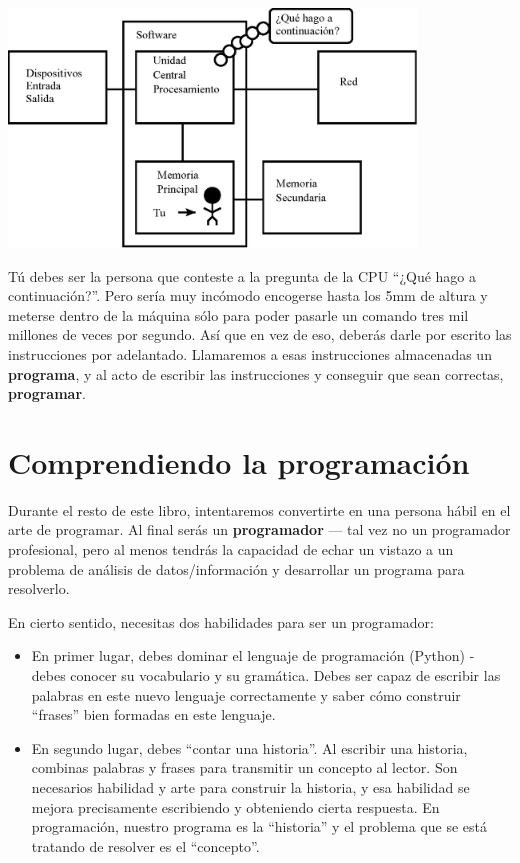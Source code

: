 \beforefig
\centerline{\includegraphics[height=2.50in]{figs2/arch2.eps}}
\afterfig

Tú debes ser la persona que conteste a la pregunta de la CPU ``¿Qué hago a continuación?''.
Pero sería muy incómodo encogerse hasta los 5mm de altura
y meterse dentro de la máquina sólo para poder pasarle un comando
tres mil millones de veces por segundo. Así que en vez de eso,
deberás darle por escrito las instrucciones por adelantado.
Llamaremos a esas instrucciones almacenadas un {\bf programa}, y al acto
de escribir las instrucciones y conseguir que
sean correctas, {\bf programar}.

\section{Comprendiendo la programación}

Durante el resto de este libro, intentaremos convertirte en una persona
hábil en el arte de programar. Al final serás un
{\bf programador} --- tal vez no un programador profesional, pero
al menos tendrás la capacidad de echar un vistazo a un problema de análisis
de datos/información y desarrollar un programa para resolverlo.


En cierto sentido, necesitas dos habilidades para ser un programador:

\begin{itemize}

\item En primer lugar, debes dominar el lenguaje de programación (Python) -
debes conocer su vocabulario y su gramática. Debes ser capaz de escribir
las palabras en este nuevo lenguaje correctamente y saber cómo construir
``frases'' bien formadas en este lenguaje.

\item En segundo lugar, debes ``contar una historia''. Al escribir una historia,
combinas palabras y frases para transmitir un concepto al lector.
Son necesarios habilidad y arte para construir la historia, y esa habilidad
se mejora precisamente escribiendo y obteniendo cierta respuesta.
En programación, nuestro programa es la ``historia'' y el problema
que se está tratando de resolver es el ``concepto''.

\end{itemize}

